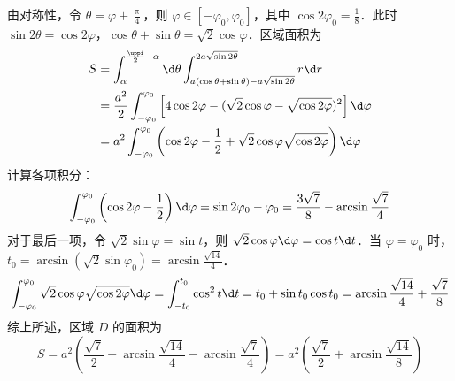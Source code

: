 \begin{solution}
    由对称性，令 $\theta = \varphi + \frac{\uppi}{4}$，则 $\varphi \in [-\varphi_0, \varphi_0]$，其中 $\cos 2\varphi_0 = \frac{1}{8}$．此时 $\sin 2\theta = \cos 2\varphi$，$\cos \theta + \sin \theta = \sqrt{2} \cos \varphi$．区域面积为
    \begin{equation}
        \begin{aligned}
            S & = \int_{\alpha}^{\frac{\uppi}{2}-\alpha} \d \theta \int_{a(\cos\theta+\sin\theta)-a\sqrt{\sin2\theta}}^{2a\sqrt{\sin2\theta}} r \d r     \\
              & = \frac{a^2}{2} \int_{-\varphi_0}^{\varphi_0} \left[ 4 \cos 2\varphi - (\sqrt{2}\cos\varphi - \sqrt{\cos 2\varphi})^2 \right] \d \varphi \\
              & = a^2 \int_{-\varphi_0}^{\varphi_0} \left( \cos 2\varphi - \frac{1}{2} + \sqrt{2}\cos\varphi\sqrt{\cos 2\varphi} \right) \d \varphi
        \end{aligned}
    \end{equation}
    计算各项积分：
    \begin{equation}
        \int_{-\varphi_0}^{\varphi_0} \left( \cos 2\varphi - \frac{1}{2} \right) \d \varphi = \sin 2\varphi_0 - \varphi_0 = \frac{3\sqrt{7}}{8} - \arcsin \frac{\sqrt{7}}{4}
    \end{equation}
    对于最后一项，令 $\sqrt{2}\sin\varphi = \sin t$，则 $\sqrt{2}\cos\varphi \d \varphi = \cos t \d t$．当 $\varphi = \varphi_0$ 时，$t_0 = \arcsin(\sqrt{2}\sin\varphi_0) = \arcsin\frac{\sqrt{14}}{4}$．
    \begin{equation}
        \int_{-\varphi_0}^{\varphi_0} \sqrt{2}\cos\varphi\sqrt{\cos 2\varphi} \d \varphi = \int_{-t_0}^{t_0} \cos^2 t \d t = t_0 + \sin t_0 \cos t_0 = \arcsin\frac{\sqrt{14}}{4} + \frac{\sqrt{7}}{8}
    \end{equation}
    综上所述，区域 $D$ 的面积为
    \begin{equation}
        S =  a^2 \left( \frac{\sqrt{7}}{2} + \arcsin \frac{\sqrt{14}}{4} - \arcsin \frac{\sqrt{7}}{4} \right) = \boxed{a^2 \left( \frac{\sqrt{7}}{2} + \arcsin \frac{\sqrt{14}}{8} \right) }
    \end{equation}

    \begin{center}
\end{center}
\end{solution}

